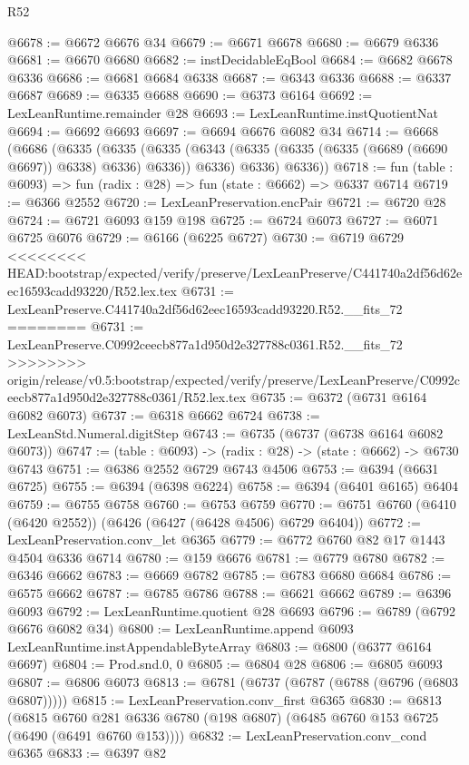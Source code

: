 \begin{lexlean}{R52}
\begin{coremodule}
{{{{{{{{{{{{{{{{{{{{{{{{{{{{{{{{{{{{{{{{{{{{{{{{{{{{{{{{{{{{{{{{{{{{{{{{{{{{{{{{{{{{{{{{{{{{{{{{{{{{{{{{{{{{{{{{{{{{{{{{{{{{{{{{{{{{{{{{{{{{{{{{{{{{{{{{{{{{{{{{{{{{{{{{{{{{{{{{{{{{{{{{{{{{{{{{{{{{{{@6678 := @6672 @6676 @34
@6679 := @6671 @6678
@6680 := @6679 @6336
@6681 := @6670 @6680
@6682 := instDecidableEqBool
@6684 := @6682 @6678 @6336
@6686 := @6681 @6684 @6338
@6687 := @6343 @6336
@6688 := @6337 @6687
@6689 := @6335 @6688
@6690 := @6373 @6164
@6692 := LexLeanRuntime.remainder @28
@6693 := LexLeanRuntime.instQuotientNat
@6694 := @6692 @6693
@6697 := @6694 @6676 @6082 @34
@6714 := @6668
    (@6686
      (@6335
        (@6335
          (@6335 (@6343 (@6335 (@6335 (@6335 (@6689 (@6690 @6697)) @6338) @6336) @6336)) @6336)
          @6336)
        @6336))
@6718 := fun (table : @6093) => fun (radix : @28) => fun (state : @6662) => @6337 @6714
@6719 := @6366 @2552
@6720 := LexLeanPreservation.encPair
@6721 := @6720 @28
@6724 := @6721 @6093 @159 @198
@6725 := @6724 @6073
@6727 := @6071 @6725 @6076
@6729 := @6166 (@6225 @6727)
@6730 := @6719 @6729
<<<<<<<< HEAD:bootstrap/expected/verify/preserve/LexLeanPreserve/C441740a2df56d62eec16593cadd93220/R52.lex.tex
@6731 := LexLeanPreserve.C441740a2df56d62eec16593cadd93220.R52.__fits_72
========
@6731 := LexLeanPreserve.C0992ceecb877a1d950d2e327788c0361.R52.__fits_72
>>>>>>>> origin/release/v0.5:bootstrap/expected/verify/preserve/LexLeanPreserve/C0992ceecb877a1d950d2e327788c0361/R52.lex.tex
@6735 := @6372 (@6731 @6164 @6082 @6073)
@6737 := @6318 @6662 @6724
@6738 := LexLeanStd.Numeral.digitStep
@6743 := @6735 (@6737 (@6738 @6164 @6082 @6073))
@6747 := (table : @6093) -> (radix : @28) -> (state : @6662) -> @6730 @6743
@6751 := @6386 @2552 @6729 @6743 @4506
@6753 := @6394 (@6631 @6725)
@6755 := @6394 (@6398 @6224)
@6758 := @6394 (@6401 @6165) @6404
@6759 := @6755 @6758
@6760 := @6753 @6759
@6770 := @6751 @6760 (@6410 (@6420 @2552)) (@6426 (@6427 (@6428 @4506) @6729 @6404))
@6772 := LexLeanPreservation.conv_let @6365
@6779 := @6772 @6760 @82 @17 @1443 @4504 @6336 @6714
@6780 := @159 @6676
@6781 := @6779 @6780
@6782 := @6346 @6662
@6783 := @6669 @6782
@6785 := @6783 @6680 @6684
@6786 := @6575 @6662
@6787 := @6785 @6786
@6788 := @6621 @6662
@6789 := @6396 @6093
@6792 := LexLeanRuntime.quotient @28 @6693
@6796 := @6789 (@6792 @6676 @6082 @34)
@6800 := LexLeanRuntime.append @6093 LexLeanRuntime.instAppendableByteArray
@6803 := @6800 (@6377 @6164 @6697)
@6804 := Prod.snd.{0, 0}
@6805 := @6804 @28
@6806 := @6805 @6093
@6807 := @6806 @6073
@6813 := @6781 (@6737 (@6787 (@6788 (@6796 (@6803 @6807)))))
@6815 := LexLeanPreservation.conv_first @6365
@6830 := @6813
    (@6815 @6760 @281 @6336 @6780 (@198 @6807) (@6485 @6760 @153 @6725 (@6490 (@6491 @6760 @153))))
@6832 := LexLeanPreservation.conv_cond @6365
@6833 := @6397 @82
}}}}}}}}}}}}}}}}}}}}}}}}}}}}}}}}}}}}}}}}}}}}}}}}}}}}}}}}}}}}}}}}}}}}}}}}}}}}}}}}}}}}}}}}}}}}}}}}}}}}}}}}}}}}}}}}}}}}}}}}}}}}}}}}}}}}}}}}}}}}}}}}}}}}}}}}}}}}}}}}}}}}}}}}}}}}}}}}}}}}}}}}}}}}}}}}}}}}}}
\end{coremodule}
\end{lexlean}
